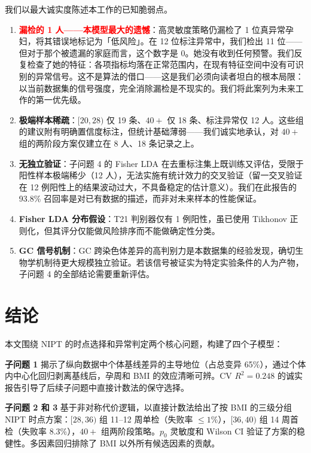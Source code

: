 \documentclass{mcm-paper}
\begin{document}
我们以最大诚实度陈述本工作的已知脆弱点。

\begin{enumerate}
    \item \textbf{\textcolor{red}{漏检的 1 人——本模型最大的遗憾}}：高灵敏度策略仍漏检了 1 位真异常孕妇，将其错误地标记为「低风险」。在 12 位标注异常中，我们检出 11 位——但对于那个被遗漏的家庭而言，这个数字是 0。她没有收到任何预警。我们反复检查了她的特征：各项指标均落在正常范围内，在现有特征空间中没有可识别的异常信号。这不是算法的借口——这是我们必须向读者坦白的根本局限：以当前数据集的信号强度，完全消除漏检是不现实的。我们将此案列为未来工作的第一优先级。
    \item \textbf{极端样本稀疏}：$[20,28)$ 仅 19 条、$40+$ 仅 18 条、标注异常仅 12 人。这些组的建议附有明确置信度标注，但统计基础薄弱——我们诚实地承认，对 $40+$ 组的两阶段方案仅建立在 8 人、18 条记录之上。
    \item \textbf{无独立验证}：子问题 4 的 Fisher LDA 在去重标注集上既训练又评估，受限于阳性样本极端稀少（12 人），无法实施有统计效力的交叉验证（留一交叉验证在 12 例阳性上的结果波动过大，不具备稳定的估计意义）。我们在此报告的 93.8\% 召回率是对已有数据的描述，而非对未来样本的性能保证。
    \item \textbf{Fisher LDA 分布假设}：T21 判别器仅有 1 例阳性，虽已使用 Tikhonov 正则化，但其评分仅能做风险排序而不能做确定性分类。
    \item \textbf{GC 信号机制}：GC 跨染色体差异的高判别力是本数据集的经验发现，确切生物学机制待更大规模独立验证。若该信号被证实为特定实验条件的人为产物，子问题 4 的全部结论需要重新评估。
\end{enumerate}

\section{结论}

本文围绕 NIPT 的时点选择和异常判定两个核心问题，构建了四个子模型：

\textbf{子问题 1} 揭示了纵向数据中个体基线差异的主导地位（占总变异 65\%），通过个体内中心化回归剥离基线后，孕周和 BMI 的效应清晰可辨。CV $R^2=0.248$ 的诚实报告引导了后续子问题中直接计数法的保守选择。

\textbf{子问题 2 和 3} 基于非对称代价逻辑，以直接计数法给出了按 BMI 的三级分组 NIPT 时点方案：$[28,36)$ 组 11--12 周单检（失败率 $\leq 1\%$），$[36,40)$ 组 14 周首检（失败率 8.3\%），$40+$ 组两阶段策略。$p_0$ 灵敏度和 Wilson CI 验证了方案的稳健性。多因素回归排除了 BMI 以外所有候选因素的贡献。
\end{document}
